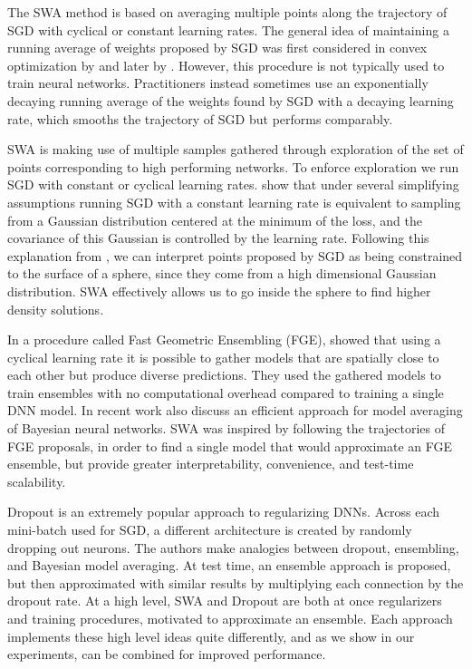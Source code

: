 \documentclass[letterpaper]{article}
\begin{document}
The SWA method is based on averaging multiple points along the trajectory
of SGD with cyclical or constant learning rates.  The general idea of maintaining
a running average of weights proposed by SGD was first considered in convex 
optimization by \citet{ruppert1988} and later by \citet{polyak1992}.  
However, this procedure is not typically used to train neural networks. Practitioners instead sometimes
use an exponentially decaying running average of the weights found by SGD with 
a decaying learning rate, which smooths the trajectory of SGD but performs comparably.

SWA is making use of multiple samples gathered through exploration of the 
set of points corresponding to high performing networks. To enforce exploration
we run SGD with constant or cyclical learning rates. \citet{mandt2017stochastic} 
show that under several simplifying assumptions running SGD with a constant
learning rate is equivalent to sampling from a Gaussian distribution centered
at the minimum of the loss, and the covariance of this Gaussian is controlled
by the learning rate. Following this explanation from \citep{mandt2017stochastic},
we can interpret points proposed by SGD as being constrained to the surface of a sphere, 
since they come from a high dimensional Gaussian distribution.  SWA effectively allows
us to go inside the sphere to find higher density solutions.

In a procedure called Fast Geometric Ensembling (FGE), \citet{garipov2018} showed that using a cyclical learning
rate it is possible to gather models that are spatially close to each other
but produce diverse predictions. They used the gathered models to train 
ensembles with no computational overhead compared to training a single 
DNN model.  In recent work \citet{neklyudov2018} also discuss an efficient approach
for model averaging of Bayesian neural networks.  SWA was inspired by 
following the trajectories of FGE proposals, in order to find a single model
that would approximate an FGE ensemble, but provide greater interpretability, convenience, and test-time 
scalability. 

Dropout \citep{srivastava2014dropout} is an extremely popular approach
to regularizing DNNs.  Across each mini-batch used for SGD, a 
different architecture is created by randomly dropping out neurons. The 
authors make analogies between dropout, ensembling, and Bayesian 
model averaging.  At test time, an ensemble approach is proposed, but
then approximated with similar results by multiplying each connection
by the dropout rate.  At a high level, SWA and Dropout are both at once
regularizers and training procedures, motivated to approximate an ensemble.
Each approach implements these high level ideas quite differently, and as we 
show in our experiments, can be combined for improved performance.
\end{document}
